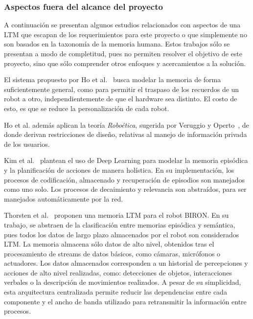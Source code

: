 \subsubsection{Aspectos fuera del alcance del proyecto}\label{sec:otros_aspectos}

A continuación se presentan algunos estudios relacionados con aspectos de una LTM que escapan de los requerimientos para este proyecto o que simplemente no son basados en la taxonomía de la memoria humana. Estos trabajos sólo se presentan a modo de completitud, pues no permiten resolver el objetivo de este proyecto, sino que sólo comprender otros enfoques y acercamientos a la solución. 

El sistema propuesto por Ho et al.~\cite{Ho2009} busca modelar la memoria de forma suficientemente general, como para permitir el traspaso de los recuerdos de un robot a otro, independientemente de que el hardware sea distinto. El costo de esto, es que se reduce la personalización de cada robot. 

Ho et al. además aplican la teoría \textit{Roboética}, sugerida por Veruggio y Operto~\cite{Veruggio2006}, de donde derivan restricciones de diseño, relativas al manejo de información privada de los usuarios.

Kim et al.~\cite{KimMinJoo2016} plantean el uso de Deep Learning para modelar la memoria episódica y la planificación de acciones de manera holística. En su implementación, los procesos de codificación, almacenado y recuperación de episodios son manejados como uno solo. Los procesos de decaimiento y relevancia son abstraídos, para ser manejados automáticamente por la red.

Thorsten et al.~\cite{Spexard2008} proponen una memoria LTM para el robot BIRON. En su trabajo, se abstraen de la clasificación entre memorias episódica y semántica, pues todos los datos de largo plazo almacenados por el robot son considerados LTM. La memoria almacena sólo datos de alto nivel, obtenidos tras el procesamiento de streams de datos básicos, como cámaras, micrófonos o actuadores. Los datos almacenados corresponden a un historial de percepciones y acciones de alto nivel realizadas, como: detecciones de objetos, interacciones verbales o la descripción de movimientos realizados. A pesar de su simplicidad, esta arquitectura centralizada permite reducir las dependencias entre cada componente y el ancho de banda utilizado para retransmitir la información entre procesos.

